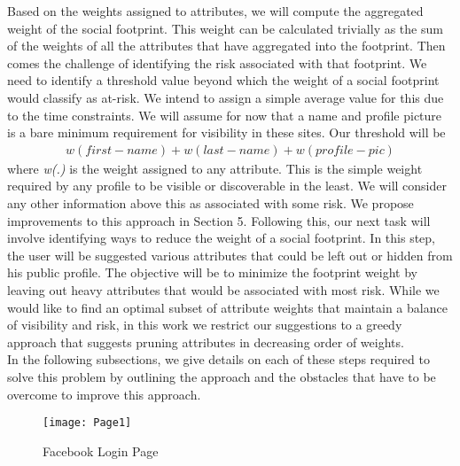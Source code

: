 \documentclass[10pt,conference]{IEEEtran}
\begin{document}
Based on the weights assigned to attributes, we will compute the aggregated weight of the social footprint. This weight can be calculated trivially as the sum of the weights of all the attributes that have aggregated into the footprint. Then comes the challenge of identifying the risk associated with that footprint. We need to identify a threshold value beyond which the weight of a social footprint would classify as at-risk. We intend to assign a simple average value for this due to the time constraints. We will assume for now that a name and profile picture is a bare minimum requirement for visibility in these sites. Our threshold will be 
\begin{align*}
w(first-name) + w(last-name) + w(profile-pic)
\end{align*}
where \textit{w(.)} is the weight assigned to any attribute. This is the simple weight required by any profile to be visible or discoverable in the least. We will consider any other information above this as associated with some risk. We propose improvements to this approach in Section 5. Following this, our next task will involve identifying ways to reduce the weight of a social footprint. In this step, the user will be suggested various attributes that could be left out or hidden from his public profile. The objective will be to minimize the footprint weight by leaving out heavy attributes that would be associated with most risk. While we would like to find an optimal subset of attribute weights that maintain a balance of visibility and risk, in this work we restrict our suggestions to a greedy approach that suggests pruning attributes in decreasing order of weights.\\

In the following subsections, we give details on each of these steps required to solve this problem by outlining the approach and the obstacles that have to be overcome to improve this approach.

	\begin{figure*}[t]
		\caption{Facebook Login Page}
		\centering
		\texttt{[image: Page1]}
	\end{figure*}
\end{document}
